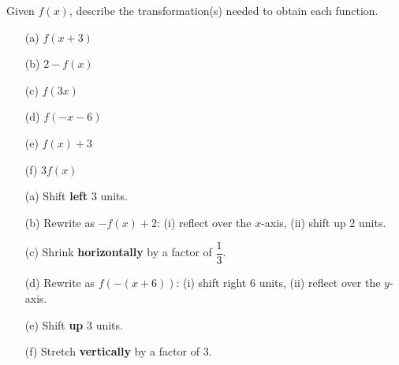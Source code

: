 \documentclass{ximera}
\begin{document}
\begin{problem}
Given $f(x)$, describe the transformation(s) needed to obtain each function.
\begin{enumerate}
  \item[(a)] $f(x+3)$
  \medskip
  \item[(b)] $2 - f(x)$
  \medskip
  \item[(c)] $f(3x)$
  \medskip
  \item[(d)] $f(-x-6)$
  \medskip
  \item[(e)] $f(x) + 3$
  \medskip
  \item[(f)] $3f(x)$
\end{enumerate}

\begin{solution}
\begin{enumerate}
  \item[(a)] Shift \textbf{left} 3 units.

  \item[(b)] Rewrite as $-f(x)+2$: (i) reflect over the $x$-axis, (ii) shift up 2 units.

  \item[(c)] Shrink \textbf{horizontally} by a factor of $\dfrac{1}{3}$.

  \item[(d)] Rewrite as $f(-(x+6))$: (i) shift right 6 units, (ii) reflect over the $y$-axis.

  \item[(e)] Shift \textbf{up} 3 units.

  \item[(f)] Stretch \textbf{vertically} by a factor of 3.
\end{enumerate}
\end{solution}
\end{problem}
\end{document}
